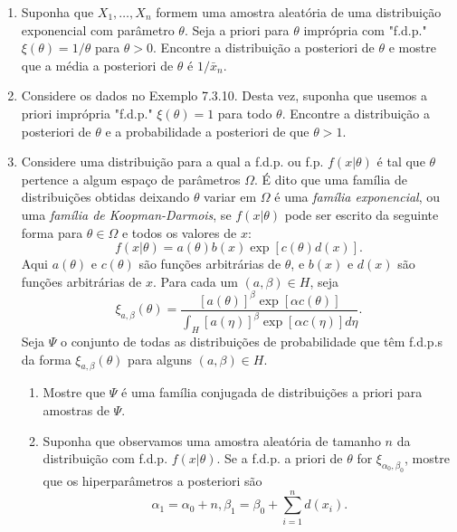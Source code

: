 \begin{enumerate}
    \item Suponha que $X_1, \dots, X_n$ formem uma amostra aleatória de uma distribuição exponencial com parâmetro $\theta$. Seja a priori para $\theta$ imprópria com "f.d.p." $\xi(\theta) = 1/\theta$ para $\theta>0$. Encontre a distribuição a posteriori de $\theta$ e mostre que a média a posteriori de $\theta$ é $1/\bar{x}_n$.
    
    \item Considere os dados no Exemplo 7.3.10. Desta vez, suponha que usemos a priori imprópria "f.d.p." $\xi(\theta) = 1$ para todo $\theta$. Encontre a distribuição a posteriori de $\theta$ e a probabilidade a posteriori de que $\theta>1$.
    
    \item Considere uma distribuição para a qual a f.d.p. ou f.p. $f(x|\theta)$ é tal que $\theta$ pertence a algum espaço de parâmetros $\Omega$. É dito que uma família de distribuições obtidas deixando $\theta$ variar em $\Omega$ é uma \textit{família exponencial}, ou uma \textit{família de Koopman-Darmois}, se $f(x|\theta)$ pode ser escrito da seguinte forma para $\theta \in \Omega$ e todos os valores de $x$:
    $$ f(x|\theta) = a(\theta)b(x)\exp[c(\theta)d(x)]. $$
    Aqui $a(\theta)$ e $c(\theta)$ são funções arbitrárias de $\theta$, e $b(x)$ e $d(x)$ são funções arbitrárias de $x$.
    Para cada um $(a, \beta) \in H$, seja
    $$ \xi_{a, \beta}(\theta) = \frac{[a(\theta)]^\beta \exp[\alpha c(\theta)]}{\int_H [a(\eta)]^\beta \exp[\alpha c(\eta)] d\eta}. $$
    Seja $\Psi$ o conjunto de todas as distribuições de probabilidade que têm f.d.p.s da forma $\xi_{a, \beta}(\theta)$ para alguns $(a, \beta) \in H$.
    \begin{enumerate}[label=(\alph*)]
        \item Mostre que $\Psi$ é uma família conjugada de distribuições a priori para amostras de $\Psi$.
        \item Suponha que observamos uma amostra aleatória de tamanho $n$ da distribuição com f.d.p. $f(x|\theta)$. Se a f.d.p. a priori de $\theta$ for $\xi_{\alpha_0, \beta_0}$, mostre que os hiperparâmetros a posteriori são
        $$ \alpha_1 = \alpha_0+n, \beta_1 = \beta_0 + \sum_{i=1}^{n}d(x_i). $$
    \end{enumerate}
    

\end{enumerate}
